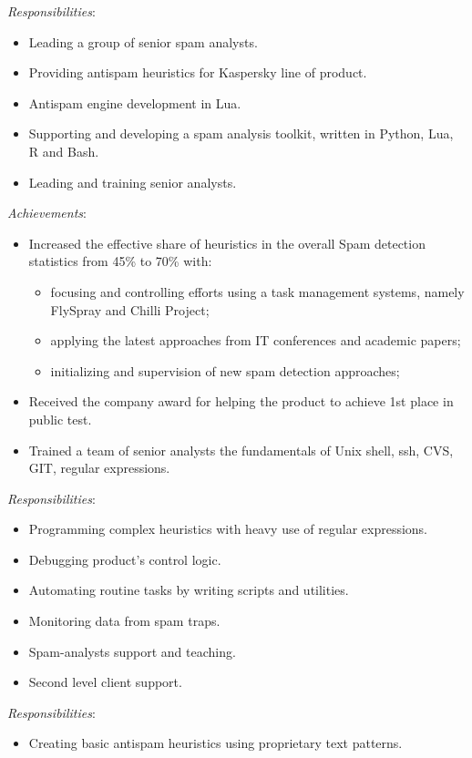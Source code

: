 \documentclass[11pt,a4paper,sans]{moderncv}        %
\newcommand{\responsibilities}[1]{ \emph{Responsibilities}:\begin{itemize} #1\end{itemize}}
\newcommand{\achievements}[1]{ \emph{Achievements}:\begin{itemize} #1\end{itemize}}
\begin{document}
 {
    \responsibilities {
        \item Leading a group of senior spam analysts.
        \item Providing antispam heuristics for Kaspersky line of product.
        \item Antispam engine development in Lua.
        \item Supporting and developing a spam analysis toolkit, written in Python, Lua, R and Bash.
	\item Leading and training senior analysts.
    }
    \achievements {
        \item Increased the effective share of heuristics in the overall Spam detection statistics from 45\% to 70\% with:
        \begin{itemize}
            \item focusing and controlling efforts using a task management systems, namely FlySpray and Chilli Project;
            \item applying the latest approaches from IT conferences and academic papers;
            \item initializing and supervision of new spam detection approaches;
        \end{itemize}
	\item Received the company award for helping the product to achieve 1st place in public test.
        \item Trained a team of senior analysts the fundamentals of Unix shell, ssh, CVS, GIT, regular expressions.
    }
}
\pagebreak
{} {
    \responsibilities {
        \item Programming complex heuristics with heavy use of regular expressions.
        \item Debugging product's control logic.
        \item Automating routine tasks by writing scripts and utilities.
        \item Monitoring data from spam traps.
        \item Spam-analysts support and teaching.
        \item Second level client support.
    }
}

 {
    \responsibilities {
        \item Creating basic antispam heuristics using proprietary text patterns.
    }
}
\end{document}
